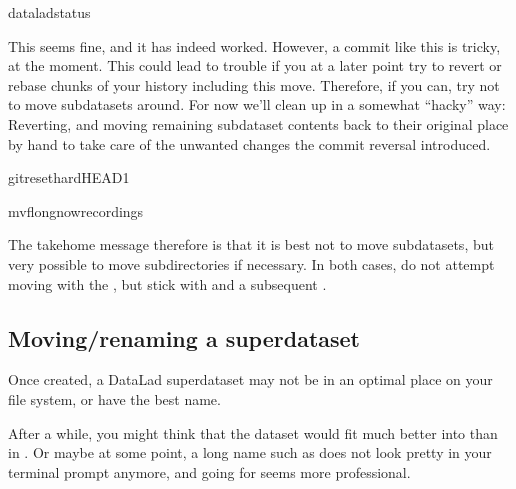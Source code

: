 \begin{sphinxVerbatim}[commandchars=\\\{\}]
dataladstatus
\end{sphinxVerbatim}

\sphinxAtStartPar
This seems fine, and it has indeed worked.
However,  a commit like this is tricky, at the moment. This could
lead to trouble if you at a later point try to revert or rebase chunks of your
history including this move. Therefore, if you can, try not to move subdatasets
around. For now we’ll clean up in a somewhat “hacky” way: Reverting, and
moving remaining subdataset contents back to their original place by hand
to take care of the unwanted changes the commit reversal introduced.

\begin{sphinxVerbatim}[commandchars=\\\{\}]
gitreset\PYGZhy{}\PYGZhy{}hardHEAD\PYGZti{}1
\end{sphinxVerbatim}

\begin{sphinxVerbatim}[commandchars=\\\{\}]
mv\PYGZhy{}flongnowrecordings
\end{sphinxVerbatim}

\sphinxAtStartPar
The take\sphinxhyphen{}home message therefore is that it is best not to move subdatasets,
but very possible to move subdirectories if necessary. In both cases, do not
attempt moving with the , but stick with  and
a subsequent .


\subsection{Moving/renaming a superdataset}
\label{\detokenize{basics/101-136-filesystem:moving-renaming-a-superdataset}}
\sphinxAtStartPar
Once created, a DataLad superdataset may not be in an optimal
place on your file system, or have the best name.

\sphinxAtStartPar
After a while, you might think that the dataset would fit much
better into  than in
. Or maybe at
some point, a long name such as 
does not look pretty in your terminal prompt anymore, and going for
 seems more professional.

